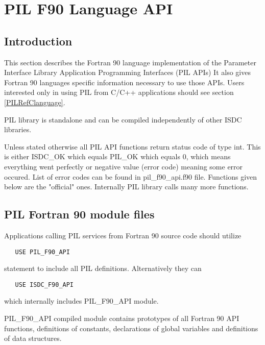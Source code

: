 \section{PIL F90 Language API}\label{PILRefF90language}
%

\subsection{Introduction}\label{PILRefF90intro}

This  section  describes  the  Fortran 90 language implementation of the
Parameter Interface Library Application Programming Interfaces (PIL APIs)
It also gives Fortran 90 languages specific
information necessary to use those APIs. Users interested only
in using PIL from C/C++ applications should see section
\ref{PILRefClanguage}. 

PIL library is standalone and can be compiled independently of other ISDC
libraries.

Unless stated otherwise all PIL API functions return status code of type
int. This is either ISDC\_OK which equals PIL\_OK which equals 0, which
means everything went perfectly or negative value (error code) meaning some
error occured. List of error codes can be found in pil\_f90\_api.f90 file.
Functions given below are the "official" ones. Internally PIL library
calls many more functions. 	

\subsection{PIL Fortran 90 module files}\label{PILRefF90Modules}

Applications calling PIL services from Fortran 90 source code should utilize

\begin{verbatim}
   USE PIL_F90_API
\end{verbatim}

statement to include all PIL definitions. Alternatively they can 

\begin{verbatim}
   USE ISDC_F90_API
\end{verbatim}

which internally includes PIL\_F90\_API module.

PIL\_F90\_API compiled module contains
prototypes of all Fortran 90 API functions, definitions of constants,
declarations of global variables and definitions of data structures.



